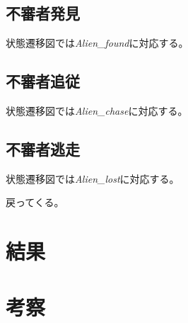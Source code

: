 \documentclass[main]{subfiles}
\begin{document}
\subsection{不審者発見}
状態遷移図では\textit{Alien\_found}に対応する。

\subsection{不審者追従}
状態遷移図では\textit{Alien\_chase}に対応する。

\subsection{不審者逃走}
状態遷移図では\textit{Alien\_lost}に対応する。

戻ってくる。

\section{結果}
\section{考察}
\end{document}
